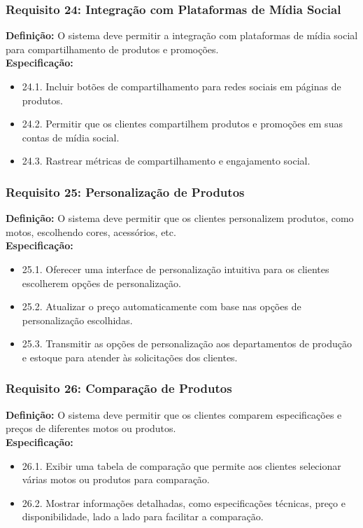\subsubsection{Requisito 24: Integração com Plataformas de Mídia Social}
\textbf{Definição:} O sistema deve permitir a integração com plataformas de mídia social para compartilhamento de produtos e promoções.
\\
\textbf{Especificação:}
\begin{itemize}
	\item 24.1. Incluir botões de compartilhamento para redes sociais em páginas de produtos.
	\item 24.2. Permitir que os clientes compartilhem produtos e promoções em suas contas de mídia social.
	\item 24.3. Rastrear métricas de compartilhamento e engajamento social.
\end{itemize}

\subsubsection{Requisito 25: Personalização de Produtos}
\textbf{Definição:} O sistema deve permitir que os clientes personalizem produtos, como motos, escolhendo cores, acessórios, etc.
\\
\textbf{Especificação:}
\begin{itemize}
	\item 25.1. Oferecer uma interface de personalização intuitiva para os clientes escolherem opções de personalização.
	\item 25.2. Atualizar o preço automaticamente com base nas opções de personalização escolhidas.
	\item 25.3. Transmitir as opções de personalização aos departamentos de produção e estoque para atender às solicitações dos clientes.
\end{itemize}

\subsubsection{Requisito 26: Comparação de Produtos}
\textbf{Definição:} O sistema deve permitir que os clientes comparem especificações e preços de diferentes motos ou produtos.
\\
\textbf{Especificação:}
\begin{itemize}
	\item 26.1. Exibir uma tabela de comparação que permite aos clientes selecionar várias motos ou produtos para comparação.
	\item 26.2. Mostrar informações detalhadas, como especificações técnicas, preço e disponibilidade, lado a lado para facilitar a comparação.
\end{itemize}

